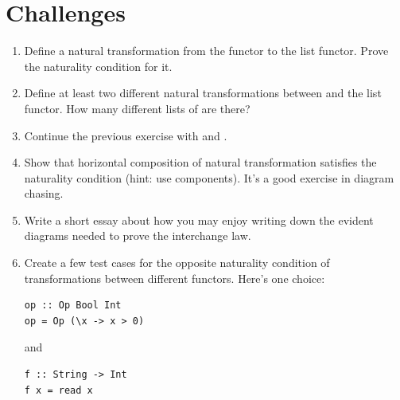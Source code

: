 \section{Challenges}\label{challenges}

\begin{enumerate}
\tightlist
\item
  Define a natural transformation from the  functor to the
  list functor. Prove the naturality condition for it.
\item
  Define at least two different natural transformations between
   and the list functor. How many different lists of
  \code{()} are there?
\item
  Continue the previous exercise with  and
  .
\item
  Show that horizontal composition of natural transformation satisfies
  the naturality condition (hint: use components). It's a good exercise
  in diagram chasing.
\item
  Write a short essay about how you may enjoy writing down the evident
  diagrams needed to prove the interchange law.
\item
  Create a few test cases for the opposite naturality condition of
  transformations between different  functors. Here's one
  choice:

\begin{verbatim}
op :: Op Bool Int
op = Op (\x -> x > 0)
\end{verbatim}

  and

\begin{verbatim}
f :: String -> Int
f x = read x
\end{verbatim}
\end{enumerate}
